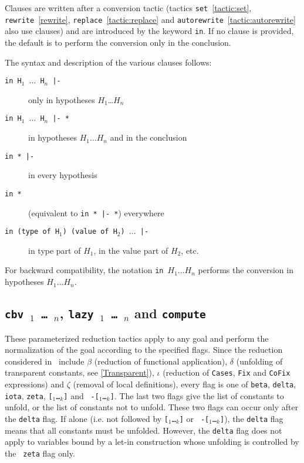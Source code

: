  Clauses are written after a conversion tactic (tactics
\texttt{set}~\ref{tactic:set},          \texttt{rewrite}~\ref{rewrite},
\texttt{replace}~\ref{tactic:replace}                               and
\texttt{autorewrite}~\ref{tactic:autorewrite}  also  use clauses)  and
are introduced by  the keyword \texttt{in}. If no  clause is provided,
the default is to perform the conversion only in the conclusion.

The syntax and description of the various clauses follows:
\begin{description}
\item[\texttt{in H$_1$ $\ldots$ H$_n$ |- }] only in hypotheses $H_1
  $\ldots$ H_n$
\item[\texttt{in H$_1$ $\ldots$ H$_n$ |- *}] in hypotheses $H_1 \ldots
  H_n$ and in the conclusion
\item[\texttt{in * |-}] in every hypothesis
\item[\texttt{in *}] (equivalent to \texttt{in * |- *}) everywhere
\item[\texttt{in (type of H$_1$) (value of H$_2$) $\ldots$ |-}] in
  type part of $H_1$, in the value part of $H_2$, etc. 
\end{description}

For backward compatibility, the notation \texttt{in}~$H_1\ldots H_n$
performs the conversion in hypotheses $H_1\ldots H_n$.


\subsection[{\tt cbv \flag$_1$ \dots\ \flag$_n$}, {\tt lazy \flag$_1$
\dots\ \flag$_n$} and {\tt compute}]
{{\tt cbv \flag$_1$ \dots\ \flag$_n$}, {\tt lazy \flag$_1$
\dots\ \flag$_n$} and {\tt compute}
\label{vmcompute}}

These parameterized reduction tactics apply to any goal and perform
the normalization of the goal according to the specified flags. Since
the reduction considered in \Coq\ include $\beta$ (reduction of
functional application), $\delta$ (unfolding of transparent constants,
see \ref{Transparent}), $\iota$ (reduction of {\tt Cases}, {\tt Fix}
and {\tt CoFix} expressions) and $\zeta$ (removal of local
definitions), every flag is one of {\tt beta}, {\tt delta}, {\tt
  iota}, {\tt zeta}, {\tt [\qualid$_1$\ldots\qualid$_k$]} and {\tt
  -[\qualid$_1$\ldots\qualid$_k$]}.  The last two flags give the list
of constants to unfold, or the list of constants not to unfold. These
two flags can occur only after the {\tt delta} flag. 
If alone (i.e. not
followed by {\tt [\qualid$_1$\ldots\qualid$_k$]} or {\tt
  -[\qualid$_1$\ldots\qualid$_k$]}), the {\tt delta} flag means that all constants must be unfolded.
However, the {\tt delta} flag does not apply to variables bound by a
let-in construction whose unfolding is controlled by the {\tt
  zeta} flag only.

